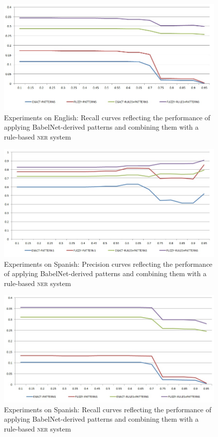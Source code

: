\documentclass[output=paper]{langsci/langscibook}
\begin{document}
\begin{figure}
\centering
\includegraphics[width=.95\textwidth]{figures/eval_patterns_English_recall.jpg}
\caption{Experiments on English: Recall curves reflecting the performance of applying BabelNet-derived patterns and combining them with a rule-based \textsc{ner} system}
\label{jac:fig:eval_patterns_english_recall}
\end{figure}

\begin{figure}
\centering
\includegraphics[width=.95\textwidth]{figures/eval_patterns_Spanish_precision.jpg}
\caption{Experiments on Spanish: Precision curves reflecting the performance of applying BabelNet-derived patterns and combining them with a rule-based \textsc{ner} system}
\label{jac:fig:eval_patterns_spanish_precision}
\end{figure}

\begin{figure}
\centering
\includegraphics[width=.95\textwidth]{figures/eval_patterns_Spanish_recall.jpg}
\caption{Experiments on Spanish: Recall curves reflecting the performance of applying BabelNet-derived patterns and combining them with a rule-based \textsc{ner} system}
\label{jac:fig:eval_patterns_spanish_recall}
\end{figure}
        
\end{document}
